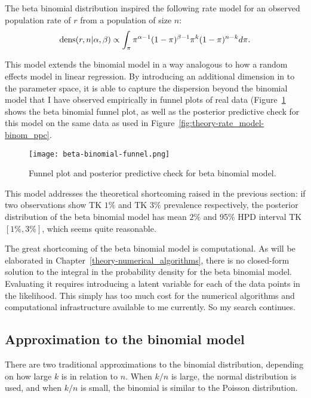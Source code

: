 The beta binomial distribution inspired the following rate model for
an observed population rate of $r$ from a population of size $n$:
\[
\operatorname{dens}(r,n|\alpha, \beta) \propto \int_{\pi}
\pi^{\alpha-1}(1-\pi)^{\beta-1} \pi^k (1-\pi)^{n-k}
d\pi.
\]

This model extends the binomial model in a way analogous to how a
random effects model in linear regression.  By introducing an
additional dimension in to the parameter space, it is able to capture
the dispersion beyond the binomial model that I have observed
empirically in funnel plots of real data
(Figure~\ref{fig:theory-rate_beta-binomial-funnel} shows the beta
binomial funnel plot, as well as the posterior predictive check for
this model on the same data as used in
Figure~\ref{fig:theory-rate_model-binom_ppc}.

\begin{figure}[ht]
\begin{center}
\texttt{[image: beta-binomial-funnel.png]}
\end{center}
\caption{Funnel plot and posterior predictive check for beta binomial model.}
\label{fig:theory-rate_beta-binomial-funnel}
\end{figure}

This model addresses the theoretical shortcoming raised in the
previous section: if two observations show TK $1\%$ and TK $3\%$ prevalence
respectively, the posterior distribution of the beta binomial model
has mean $2\%$ and 95\% HPD interval TK $[1\%,3\%]$, which seems quite
reasonable.

The great shortcoming of the beta binomial model is computational.  As
will be elaborated in Chapter~\ref{theory-numerical_algorithms}, there
is no closed-form solution to the integral in the probability density
for the beta binomial model.  Evaluating it requires introducing a
latent variable for each of the data points in the likelihood.  This
simply has too much cost for the numerical algorithms and
computational infrastructure available to me currently.  So my search
continues.

\subsection{Approximation to the binomial model}
There are two traditional approximations to the binomial distribution,
depending on how large $k$ is in relation to $n$.  When $k/n$ is
large, the normal distribution is used, and when $k/n$ is small, the
binomial is similar to the Poisson distribution.

